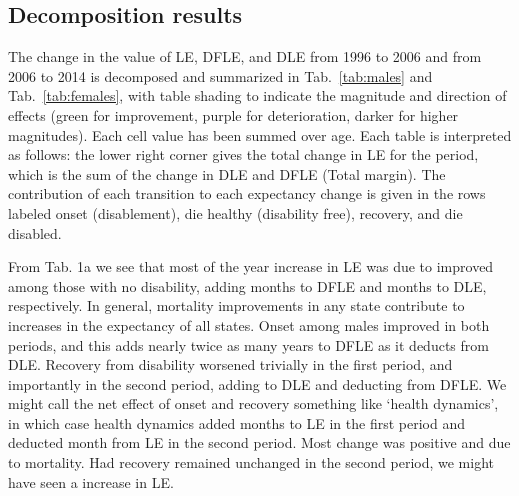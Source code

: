 \subsection{Decomposition results}
The change in the value of LE, DFLE, and DLE from 1996 to 2006 and from 2006 to 2014 is decomposed and summarized in Tab.~\ref{tab:males} and Tab.~\ref{tab:females}, with table shading to indicate the magnitude and direction of effects (green for improvement, purple for deterioration, darker for higher magnitudes). Each cell value has been summed over age. Each table is interpreted as follows: the lower right corner gives the total change in LE for the period, which is the sum of the change in DLE and DFLE (Total margin). The contribution of each transition to each expectancy change is given in the rows labeled onset (disablement), die healthy (disability free), recovery, and die disabled.

From Tab. 1a we see that most of the  year increase in LE was due to improved among those with no disability, adding  months to DFLE and  months to DLE, respectively. In general, mortality improvements in any state contribute to increases in the expectancy of all states. Onset among males improved in both periods, and this adds nearly twice as many years to DFLE as it deducts from DLE. Recovery from disability worsened trivially in the first period, and importantly in the second period, adding  to DLE and deducting  from DFLE. We might call the net effect of onset and recovery something like `health dynamics', in which case health dynamics added  months to LE in the first period and deducted  month from LE in the second period. Most change was positive and due to mortality. Had recovery remained unchanged in the second period, we might have seen a  increase in LE.



\begin{table}[!ht]
      \caption{Males (all education combined). Contributions of changes in each transition to the change in each expectancy.}
      \label{tab:males}
      \centering
{}
     \qquad
{}
\end{table}


